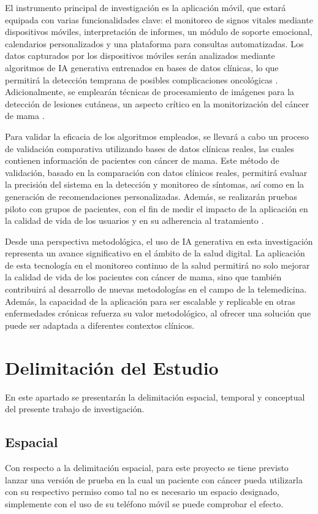 El instrumento principal de investigación es la aplicación móvil, que estará equipada con varias funcionalidades clave: el monitoreo de signos vitales mediante dispositivos móviles, interpretación de informes, un módulo de soporte emocional, calendarios personalizados y una plataforma para consultas automatizadas. Los datos capturados por los dispositivos móviles serán analizados mediante algoritmos de IA generativa entrenados en bases de datos clínicas, lo que permitirá la detección temprana de posibles complicaciones oncológicas \parencite{masciantonio2017}. Adicionalmente, se emplearán técnicas de procesamiento de imágenes para la detección de lesiones cutáneas, un aspecto crítico en la monitorización del cáncer de mama \parencite{leung2022}.

Para validar la eficacia de los algoritmos empleados, se llevará a cabo un proceso de validación comparativa utilizando bases de datos clínicas reales, las cuales contienen información de pacientes con cáncer de mama. Este método de validación, basado en la comparación con datos clínicos reales, permitirá evaluar la precisión del sistema en la detección y monitoreo de síntomas, así como en la generación de recomendaciones personalizadas. Además, se realizarán pruebas piloto con grupos de pacientes, con el fin de medir el impacto de la aplicación en la calidad de vida de los usuarios y en su adherencia al tratamiento \parencite{beltran2023}.

Desde una perspectiva metodológica, el uso de IA generativa en esta investigación representa un avance significativo en el ámbito de la salud digital. La aplicación de esta tecnología en el monitoreo continuo de la salud permitirá no solo mejorar la calidad de vida de los pacientes con cáncer de mama, sino que también contribuirá al desarrollo de nuevas metodologías en el campo de la telemedicina. Además, la capacidad de la aplicación para ser escalable y replicable en otras enfermedades crónicas refuerza su valor metodológico, al ofrecer una solución que puede ser adaptada a diferentes contextos clínicos.

\section{Delimitación del Estudio}
En este apartado se presentarán la delimitación espacial, temporal y conceptual del presente trabajo de investigación.
\subsection{Espacial}
Con respecto a la delimitación espacial, para este proyecto se tiene previsto lanzar una versión de prueba en la cual un paciente con cáncer pueda utilizarla con su respectivo permiso como tal no es necesario un espacio designado, simplemente con el uso de su teléfono móvil se puede comprobar el efecto.


